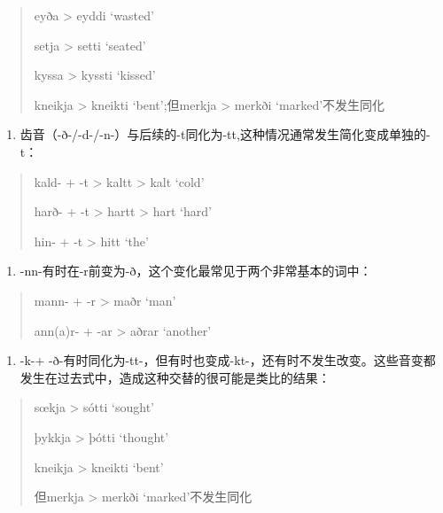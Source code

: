  \begin{quote}
    eyða \textgreater{} eyddi `wasted'
  
    setja \textgreater{} setti `seated'
  
    kyssa \textgreater{} kyssti `kissed'
  
    kneikja \textgreater{} kneikti `bent';但merkja \textgreater{} merkði
    `marked'不发生同化
  \end{quote}
  
  \begin{enumerate}
    \def\labelenumi{(\alph{enumi})}
    \setcounter{enumi}{2}
    \item
          齿音（-ð-/-d-/-n-）与后续的-t同化为-tt,这种情况通常发生简化变成单独的-t：
  \end{enumerate}
  
  \begin{quote}
    kald- + -t \textgreater{} kaltt \textgreater{} kalt `cold'
  
    harð- + -t \textgreater{} hartt \textgreater{} hart `hard'
  
    hin- + -t \textgreater{} hitt `the'
  \end{quote}
  
  \begin{enumerate}
    \def\labelenumi{(\alph{enumi})}
    \setcounter{enumi}{3}
    \item
          -nn-有时在-r前变为-ð，这个变化最常见于两个非常基本的词中：
  \end{enumerate}
  
  \begin{quote}
    mann- + -r \textgreater{} maðr `man'
  
    ann(a)r- + -ar \textgreater{} aðrar `another'
  \end{quote}
  
  \begin{enumerate}
    \def\labelenumi{(\alph{enumi})}
    \setcounter{enumi}{4}
    \item
          -k-+
          -ð-有时同化为-tt-，但有时也变成-kt-，还有时不发生改变。这些音变都发生在过去式中，造成这种交替的很可能是类比的结果：
  \end{enumerate}
  
  \begin{quote}
    sœkja \textgreater{} sótti `sought'
  
    þykkja \textgreater{} þótti `thought'
  
    kneikja \textgreater{} kneikti `bent'
  
    但merkja \textgreater{} merkði `marked'不发生同化
  \end{quote}
  

